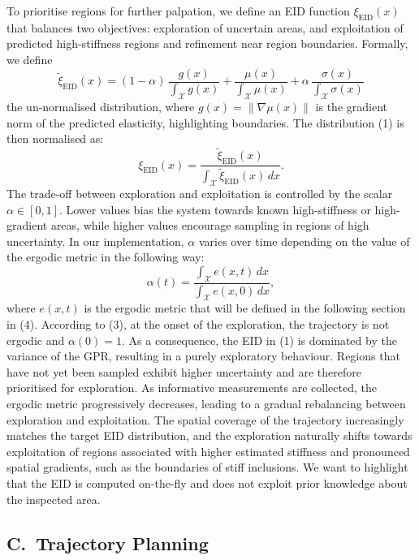 \documentclass[11pt]{article}
\begin{document}
To prioritise regions for further palpation, we define an EID
function $\xi_{\mathrm{EID}}(x)$ that balances two objectives:
exploration of uncertain areas, and exploitation of predicted
high-stiffness regions and refinement near region boundaries.
Formally, we define
\begin{equation}
\tilde{\xi}_{\mathrm{EID}}(x) =
(1 - \alpha)\,\frac{g(x)}{\int_{\mathcal{X}} g(x)}
+ \frac{\mu(x)}{\int_{\mathcal{X}} \mu(x)}
+ \alpha\,\frac{\sigma(x)}{\int_{\mathcal{X}} \sigma(x)}
\end{equation}
the un-normalised distribution, where
$g(x) = \|\nabla \mu(x)\|$ is the gradient norm of the predicted
elasticity, highlighting boundaries. The distribution (1) is then
normalised as:
\begin{equation}
\xi_{\mathrm{EID}}(x) =
\frac{\tilde{\xi}_{\mathrm{EID}}(x)}%
{\int_{\mathcal{X}} \tilde{\xi}_{\mathrm{EID}}(x)\, dx}.
\end{equation}
The trade-off between exploration and exploitation is controlled by
the scalar $\alpha \in [0, 1]$. Lower values bias the system towards
known high-stiffness or high-gradient areas, while higher values
encourage sampling in regions of high uncertainty. In our
implementation, $\alpha$ varies over time depending on the value of
the ergodic metric in the following way:
\begin{equation}
\alpha(t) =
\frac{\int_{\mathcal{X}} e(x, t)\, dx}%
{\int_{\mathcal{X}} e(x, 0)\, dx},
\end{equation}
where $e(x, t)$ is the ergodic metric that will be defined in the
following section in (4). According to (3), at the onset of the
exploration, the trajectory is not ergodic and $\alpha(0) = 1$. As a
consequence, the EID in (1) is dominated by the variance of the GPR,
resulting in a purely exploratory behaviour. Regions that have not
yet been sampled exhibit higher uncertainty and are therefore
prioritised for exploration. As informative measurements are
collected, the ergodic metric progressively decreases, leading to a
gradual rebalancing between exploration and exploitation. The
spatial coverage of the trajectory increasingly matches the target
EID distribution, and the exploration naturally shifts towards
exploitation of regions associated with higher estimated stiffness
and pronounced spatial gradients, such as the boundaries of stiff
inclusions. We want to highlight that the EID is computed on-the-fly
and does not exploit prior knowledge about the inspected area.

\subsection*{C.\ Trajectory Planning}
\end{document}
